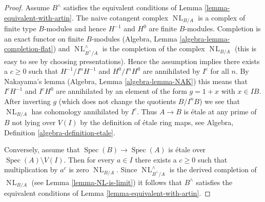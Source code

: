 \documentclass[10pt,a4paper]{amsart}
\theoremstyle{plain}
\theoremstyle{definition}
\theoremstyle{remark}
\numberwithin{equation}{subsection}
\def\Spec{\mathop{\mathrm{Spec}}}
\def\NL{\mathop{N\!L}\nolimits}
\begin{document}
\begin{proof}
Assume $B^\wedge$ satisfies the equivalent conditions of
Lemma \ref{lemma-equivalent-with-artin}.
The naive cotangent complex $\NL_{B/A}$ is a complex of finite type
$B$-modules and hence $H^{-1}$ and $H^0$ are finite $B$-modules.
Completion is an exact functor on finite $B$-modules (Algebra,
Lemma \ref{algebra-lemma-completion-flat}) and $\NL_{B^\wedge/A}^\wedge$
is the completion of the complex $\NL_{B/A}$ (this is easy to see
by choosing presentations).
Hence the assumption implies there exists a $c \geq 0$ such that
$H^{-1}/I^nH^{-1}$ and $H^0/I^nH^0$ are annihilated by $I^c$
for all $n$. By Nakayama's lemma (Algebra, Lemma \ref{algebra-lemma-NAK})
this means that $I^cH^{-1}$ and $I^cH^0$ are annihilated by an element
of the form $g = 1 + x$ with $x \in IB$. After inverting $g$
(which does not change the quotients $B/I^nB$)
we see that $\NL_{B/A}$ has cohomology annihilated by $I^c$. Thus
$A \to B$ is \'etale at any prime of $B$ not lying over $V(I)$
by the definition of \'etale ring maps, see
Algebra, Definition \ref{algebra-definition-etale}.

\medskip\noindent
Conversely, assume that $\Spec(B) \to \Spec(A)$ is \'etale over
$\Spec(A) \setminus V(I)$. Then for every $a \in I$ there exists
a $c \geq 0$ such that multiplication by $a^c$ is zero $\NL_{B/A}$.
Since $\NL_{B^\wedge/A}^\wedge$ is the derived completion of
$\NL_{B/A}$ (see Lemma \ref{lemma-NL-is-limit}) it follows that
$B^\wedge$ satisfies the equivalent conditions of
Lemma \ref{lemma-equivalent-with-artin}.
\end{proof}
\end{document}
